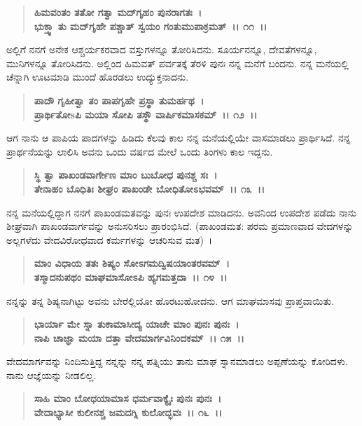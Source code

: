 \begin{verse}
\textbf{ಹಿಮವಂತಂ ತತೋ ಗತ್ವಾ ಮದ್‌ಗೃಹಂ ಪುನರಾಗತಃ~।}\\\textbf{ಭುಕ್ತ್ವಾ ತು ಮದ್‌ಗೃಹೇ ಪಶ್ಚಾತ್ ಸ್ವಯಂ ಗಂತುಮುಪಾಕ್ರಮತ್~।। ೧೧~।।}
\end{verse}

ಅಲ್ಲಿಗೆ ನನಗೆ ಅನೇಕ ಆಶ್ಚರ್ಯಕರವಾದ ವಸ್ತುಗಳನ್ನೂ ತೋರಿಸಿದನು. ಸೂರ್ಯನನ್ನೂ, ದೇವತೆಗಳನ್ನೂ, ಮುನಿಗಳನ್ನೂ ತೋರಿಸಿದನು. ಅಲ್ಲಿಂದ ಹಿಮವತ್ ಪರ್ವತಕ್ಕೆ ತೆರಳಿ ಪುನಃ ನನ್ನ ಮನೆಗೆ ಬಂದನು. ನನ್ನ ಮನೆಯಲ್ಲಿ ಚೆನ್ನಾಗಿ ಊಟಮಾಡಿ ಮುಂದೆ ಹೊರಡಲು ಉದ್ಯುಕ್ತನಾದನು.

\begin{verse}
\textbf{ಪಾದೌ ಗೃಹೀತ್ವಾ ತಂ ಪಾಪಗೃಹೇ ಪ್ರಸ್ಥಾ ತುಮರ್ಹಥ~।}\\\textbf{ಪ್ರಾರ್ಥಿತೋsಪಿ ಮಯಾ ಸೋಪಿ ತಸ್ಥೌ ವಾರ್ಷಿಕಮಾಸಕಮ್~।। ೧೨~।।}
\end{verse}

ಆಗ ನಾನು ಆ ಪಾಪಿಯ ಪಾದಗಳನ್ನು ಹಿಡಿದು ಕೆಲವು ಕಾಲ ನನ್ನ ಮನೆಯಲ್ಲಿಯೇ ವಾಸಮಾಡಲು ಪ್ರಾರ್ಥಿಸಿದೆ. ನನ್ನ ಪ್ರಾರ್ಥನೆಯನ್ನು ಲಾಲಿಸಿ ಅವನು ಒಂದು ವರ್ಷದ ಮೇಲೆ ಒಂದು ತಿಂಗಳು ಕಾಲ ಇದ್ದನು.

\begin{verse}
\textbf{ಸ್ಥಿ ತ್ವಾ ಪಾಖಂಡವಾರ್ಗೇಣ ಮಾಂ ಬುಬೋಧ ಪುನಶ್ಚ ಸಃ~।}\\\textbf{ತೇನಾಹಂ ಬೊಧಿತಿಃ ಶೀಘ್ರಂ ಪಾಖಂಡೇ ಬೋಧಿತೋಽಭವಮ್~।। ೧೩~।।}
\end{verse}

ನನ್ನ ಮನೆಯಲ್ಲಿದ್ದಾಗ ನನಗೆ ಪಾಖಂಡಮತವನ್ನು ಪುನಃ ಉಪದೇಶ ಮಾಡಿದನು. ಅವನಿಂದ ಉಪದೇಶ ಪಡೆದು ನಾನು ಶೀಘ್ರವಾಗಿ ಪಾಖಂಡವಾರ್ಗವನ್ನು ಅನುಸರಿಸಲು ಪ್ರಾರಂಭಿಸಿದೆ. (ಪಾಖಂಡಮತ: ಪರಮ ಪ್ರಮಾಣವಾದ ವೇದಗಳನ್ನು ಅಲ್ಲಗಳೆದು ವೇದವಿರೋಧವಾದ ಕರ್ಮಗಳನ್ನು ಆಚರಿಸುವ ಮತ)~।

\begin{verse}
\textbf{ಮಾಂ ವಿಧಾಯ ತತಃ ಶಿಷ್ಯಂ ಸೋಽಗಮದ್ವಿಷಯಾಂತರವಮ್~।}\\\textbf{ತಸ್ಮಾದನುಪಥಂ ಮಾಘಮಾಸೋಽಪಿ ಹ್ಯಗಮತ್ತದಾ~।। ೧೪~।।}
\end{verse}

ನನ್ನನ್ನು ತನ್ನ ಶಿಷ್ಯನಾಗಿಟ್ಟು ಅವನು ಬೇರೆಲ್ಲಿಯೋ ಹೊರಟುಹೋದನು. ಆಗ ಮಾಘಮಾಸವು ಪ್ರಾಪ್ತವಾಯಿತು.

\begin{verse}
\textbf{ಭಾರ್ಯಾ ಮೇ ಸ್ನಾ ತುಕಾಮಾಸೀದ್ಯ ಯಾಚೇ ಮಾಂ ಪುನಃ ಪುನಃ~।}\\\textbf{ನಾಪಿ ಚಾಜ್ಞಾ ಮಯಾ ದತ್ತಾ ವೇದಮಾರ್ಗವಿನಿಂದಕಮ್~।। ೧೫~।।}
\end{verse}

ವೇದಮಾರ್ಗವನ್ನು ನಿಂದಿಸುತ್ತಿದ್ದ ನನ್ನನ್ನು ನನ್ನ ಪತ್ನಿಯು ತಾನು ಮಾಘ ಸ್ನಾನಮಾಡಲು ಅಪ್ಪಣೆಯನ್ನು ಕೋರಿದಳು. ನಾನು ಆಜ್ಞೆಯನ್ನು ನೀಡಲಿಲ್ಲ.

\begin{verse}
\textbf{ಸಾಹಿ ಮಾಂ ಬೋಧಯಾಮಾಸ ಧರ್ಮವಾಕ್ಯೈಃ ಪುನಃ ಪುನಃ~।}\\\textbf{ವೇದಾಭ್ಯಾಸೀ ಕುಲೀನಶ್ಚ ಜಮದಗ್ನಿ ಕುಲೋದ್ಭವಃ~।। ೧೬~।।} 
\end{verse}

